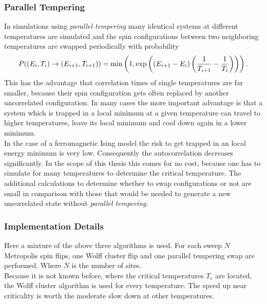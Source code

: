     \subsubsection{Parallel Tempering}
        In simulations using \emph{parallel tempering} \cite{ParallelTempering1986}
        many identical systems at different temperatures are simulated and
        the spin configurations between two neighboring temperatures are
        swapped periodically with probability \cite[p. 169ff]{NewmanBarkema1999} \cite[S. 155ff]{Katzgraber2011}
        \begin{equation}
            P((E_i,T_i) \to (E_{i+1},T_{i+1})) = \min\left(1,\exp\left(\left(E_{i+1}-E_i\right)\left(\frac{1}{T_{i+1}}-\frac{1}{T_i}\right)\right)\right).
            \label{eq:partemp}
        \end{equation}
        This has the advantage that correlation times of single
        temperatures are far smaller, because their spin configuration
        gets often replaced by another uncorrelated configuration. In
        many cases the more important advantage is that a system which
        is trapped in a local minimum at a given temperature can travel
        to higher temperatures, leave its local minimum and cool down
        again in a lower minimum.\\
        In the case of a ferromagnetic Ising model the risk to get trapped
        in an local energy minimum is very low. Consequently the autocorrelation
        decreases significantly. In the scope of this thesis this comes
        for no cost, because one has to simulate for many temperatures
        to determine the critical temperature. The additional calculations
        to determine whether to swap configurations or not are small in
        comparison with those that would be needed to generate a new
        uncorrelated state without \emph{parallel tempering}.

    \subsubsection{Implementation Details}
        Here a mixture of the above three algorithms is used.
        For each sweep \(N\) Metropolis spin flips, one Wolff cluster flip
        and one parallel tempering swap are performed. Where \(N\) is the
        number of sites.\\
        Because it is not known before, where the critical temperatures
        \(T_c\) are located, the Wolff cluster algorithm is used for
        every temperature. The speed up near criticality is worth the
        moderate slow down at other temperatures.


